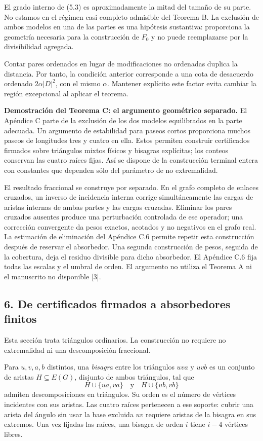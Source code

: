 \documentclass[spanish,11pt,a4paper]{article}
\begin{document}
El grado interno de (5.3) es aproximadamente la mitad del tamaño de su parte. No estamos en el régimen casi completo admisible del Teorema B. La exclusión de ambos modelos en una de las partes es una hipótesis sustantiva: proporciona la geometría necesaria para la construcción de \(F_0\) y no puede reemplazarse por la divisibilidad agregada.

Contar pares ordenados en lugar de modificaciones no ordenadas duplica la distancia. Por tanto, la condición anterior corresponde a una cota de desacuerdo ordenado \(2\alpha|D|^2\), con el mismo \(\alpha\). Mantener explícito este factor evita cambiar la región excepcional al aplicar el teorema.

\textbf{Demostración del Teorema C: el argumento geométrico separado.} El Apéndice C parte de la exclusión de los dos modelos equilibrados en la parte adecuada. Un argumento de estabilidad para paseos cortos proporciona muchos paseos de longitudes tres y cuatro en ella. Estos permiten construir certificados firmados sobre triángulos mixtos físicos y bisagras explícitas; los conteos conservan las cuatro raíces fijas. Así se dispone de la construcción terminal entera con constantes que dependen sólo del parámetro de no extremalidad.

El resultado fraccional se construye por separado. En el grafo completo de enlaces cruzados, un inverso de incidencia interna corrige simultáneamente las cargas de aristas internas de ambas partes y las cargas cruzadas. Eliminar los pares cruzados ausentes produce una perturbación controlada de ese operador; una corrección convergente da pesos exactos, acotados y no negativos en el grafo real. La estimación de eliminación del Apéndice C.6 permite repetir esta construcción después de reservar el absorbedor. Una segunda construcción de pesos, seguida de la cobertura, deja el residuo divisible para dicho absorbedor. El Apéndice C.6 fija todas las escalas y el umbral de orden. El argumento no utiliza el Teorema A ni el manuscrito no disponible {[}3{]}.

\subsection{6. De certificados firmados a absorbedores finitos}\label{de-certificados-firmados-a-absorbedores-finitos}

Esta sección trata triángulos ordinarios. La construcción no requiere no extremalidad ni una descomposición fraccional.

Para \(u,v,a,b\) distintos, una \emph{bisagra} entre los triángulos \(uva\) y \(uvb\) es un conjunto de aristas \(H\subseteq E(G)\), disjunto de ambos triángulos, tal que \[H\cup\{ua,va\}\quad\text{y}\quad H\cup\{ub,vb\}
\tag{6.1}\] admiten descomposiciones en triángulos. Su orden es el número de vértices incidentes con sus aristas. Las cuatro raíces pertenecen a ese soporte: cubrir una arista del ángulo sin usar la base excluida \(uv\) requiere aristas de la bisagra en sus extremos. Una vez fijadas las raíces, una bisagra de orden \(i\) tiene \(i-4\) vértices libres.
\end{document}

